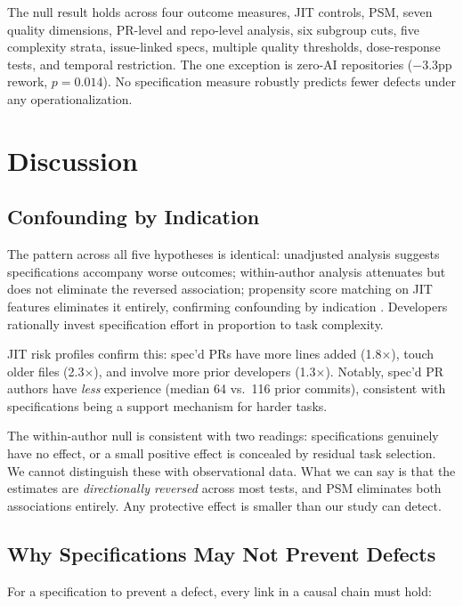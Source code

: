 \documentclass[a4paper,UKenglish,cleveref,autoref,thm-restate]{lipics-v2021}
\begin{document}
The null result holds across four outcome measures, JIT controls, PSM, seven quality dimensions, PR-level and repo-level analysis, six subgroup cuts, five complexity strata, issue-linked specs, multiple quality thresholds, dose-response tests, and temporal restriction. The one exception is zero-AI repositories ($-3.3$pp rework, $p = 0.014$). No specification measure robustly predicts fewer defects under any operationalization.

\section{Discussion}

\subsection{Confounding by Indication}

The pattern across all five hypotheses is identical: unadjusted analysis suggests specifications accompany worse outcomes; within-author analysis attenuates but does not eliminate the reversed association; propensity score matching on JIT features eliminates it entirely, confirming confounding by indication \cite{salas1999}. Developers rationally invest specification effort in proportion to task complexity.

JIT risk profiles confirm this: spec'd PRs have more lines added (1.8$\times$), touch older files (2.3$\times$), and involve more prior developers (1.3$\times$). Notably, spec'd PR authors have \emph{less} experience (median 64 vs.\ 116 prior commits), consistent with specifications being a support mechanism for harder tasks.

The within-author null is consistent with two readings: specifications genuinely have no effect, or a small positive effect is concealed by residual task selection. We cannot distinguish these with observational data. What we can say is that the estimates are \emph{directionally reversed} across most tests, and PSM eliminates both associations entirely. Any protective effect is smaller than our study can detect.

\subsection{Why Specifications May Not Prevent Defects}

For a specification to prevent a defect, every link in a causal chain must hold:
\end{document}
